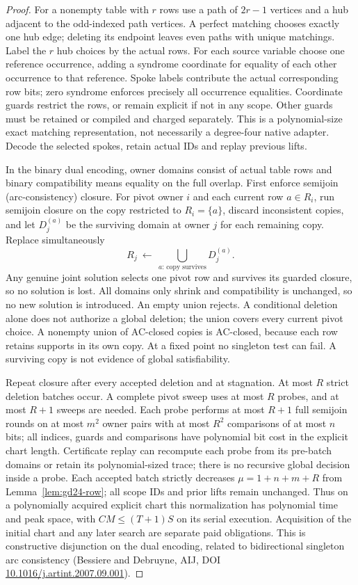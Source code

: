 \documentclass[11pt]{article}
\begin{document}
\begin{proof}
For a nonempty table with $r$ rows use a path of $2r-1$ vertices and a hub adjacent to the odd-indexed path vertices. A perfect matching chooses exactly one hub edge; deleting its endpoint leaves even paths with unique matchings. Label the $r$ hub choices by the actual rows. For each source variable choose one reference occurrence, adding a syndrome coordinate for equality of each other occurrence to that reference. Spoke labels contribute the actual corresponding row bits; zero syndrome enforces precisely all occurrence equalities. Coordinate guards restrict the rows, or remain explicit if not in any scope. Other guards must be retained or compiled and charged separately. This is a polynomial-size exact matching representation, not necessarily a degree-four native adapter. Decode the selected spokes, retain actual IDs and replay previous lifts.

In the binary dual encoding, owner domains consist of actual table rows and binary compatibility means equality on the full overlap. First enforce semijoin (arc-consistency) closure. For pivot owner $i$ and each current row $a\in R_i$, run semijoin closure on the copy restricted to $R_i=\{a\}$, discard inconsistent copies, and let $D_j^{(a)}$ be the surviving domain at owner $j$ for each remaining copy. Replace simultaneously
\[
 R_j\ \longleftarrow\ \bigcup_{a:\,\text{copy survives}} D_j^{(a)} .
\]
Any genuine joint solution selects one pivot row and survives its guarded closure, so no solution is lost. All domains only shrink and compatibility is unchanged, so no new solution is introduced. An empty union rejects. A conditional deletion alone does not authorize a global deletion; the union covers every current pivot choice. A nonempty union of AC-closed copies is AC-closed, because each row retains supports in its own copy. At a fixed point no singleton test can fail. A surviving copy is not evidence of global satisfiability.

Repeat closure after every accepted deletion and at stagnation. At most $R$ strict deletion batches occur. A complete pivot sweep uses at most $R$ probes, and at most $R+1$ sweeps are needed. Each probe performs at most $R+1$ full semijoin rounds on at most $m^2$ owner pairs with at most $R^2$ comparisons of at most $n$ bits; all indices, guards and comparisons have polynomial bit cost in the explicit chart length. Certificate replay can recompute each probe from its pre-batch domains or retain its polynomial-sized trace; there is no recursive global decision inside a probe. Each accepted batch strictly decreases $\mu=1+n+m+R$ from Lemma~\ref{lem:gd24-row}; all scope IDs and prior lifts remain unchanged. Thus on a polynomially acquired explicit chart this normalization has polynomial time and peak space, with $CM\le(T+1)S$ on its serial execution. Acquisition of the initial chart and any later search are separate paid obligations. This is constructive disjunction on the dual encoding, related to bidirectional singleton arc consistency (Bessiere and Debruyne, AIJ, DOI \href{https://doi.org/10.1016/j.artint.2007.09.001}{10.1016/j.artint.2007.09.001}).
\end{proof}
\end{document}
